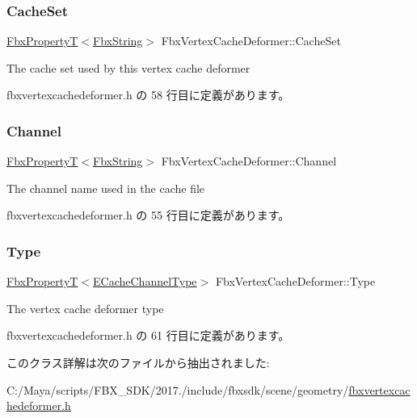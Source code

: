 \subsubsection{\texorpdfstring{Cache\+Set}{CacheSet}}
{\footnotesize\ttfamily \hyperlink{class_fbx_property_t}{Fbx\+PropertyT}$<$\hyperlink{class_fbx_string}{Fbx\+String}$>$ Fbx\+Vertex\+Cache\+Deformer\+::\+Cache\+Set}



The cache set used by this vertex cache deformer 



 fbxvertexcachedeformer.\+h の 58 行目に定義があります。

\mbox{\label{class_fbx_vertex_cache_deformer_a70c66f374f95dd42c0ee91077b04cb42}} 
\subsubsection{\texorpdfstring{Channel}{Channel}}
{\footnotesize\ttfamily \hyperlink{class_fbx_property_t}{Fbx\+PropertyT}$<$\hyperlink{class_fbx_string}{Fbx\+String}$>$ Fbx\+Vertex\+Cache\+Deformer\+::\+Channel}



The channel name used in the cache file 



 fbxvertexcachedeformer.\+h の 55 行目に定義があります。

\mbox{\label{class_fbx_vertex_cache_deformer_a48db6d058d753fdfa14400a3f39d2260}} 
\subsubsection{\texorpdfstring{Type}{Type}}
{\footnotesize\ttfamily \hyperlink{class_fbx_property_t}{Fbx\+PropertyT}$<$\hyperlink{class_fbx_vertex_cache_deformer_a24f0c46d4f47717615852a8e7346efed}{E\+Cache\+Channel\+Type}$>$ Fbx\+Vertex\+Cache\+Deformer\+::\+Type}



The vertex cache deformer type 



 fbxvertexcachedeformer.\+h の 61 行目に定義があります。



このクラス詳解は次のファイルから抽出されました\+:\begin{DoxyCompactItemize}
\item 
C\+:/\+Maya/scripts/\+F\+B\+X\+\_\+\+S\+D\+K/2017./include/fbxsdk/scene/geometry/\hyperlink{fbxvertexcachedeformer_8h}{fbxvertexcachedeformer.\+h}\end{DoxyCompactItemize}
